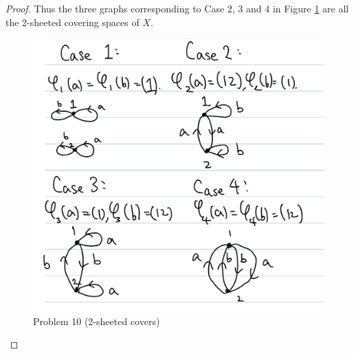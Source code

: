 \documentclass[12pt, psamsfonts]{amsart}
\theoremstyle{definition}
\theoremstyle{remark}
\numberwithin{equation}{section}
\begin{document}
\begin{proof}
  Thus the three graphs corresponding to Case 2, 3 and 4 in Figure \ref{fig:problem10_2_sheeted} are all the 2-sheeted covering spaces of $X$.

  \begin{figure}
    \includegraphics[width=.5\linewidth]{problem10_2_sheeted.jpeg}
    \caption{Problem 10 (2-sheeted covers)}
    \label{fig:problem10_2_sheeted}
  \end{figure}


\end{proof}
\end{document}
